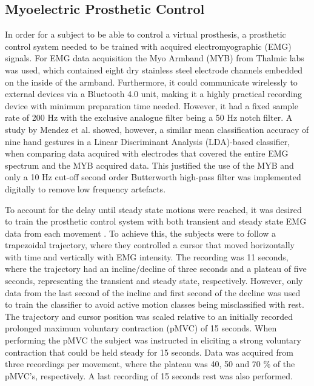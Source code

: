 \subsection{Myoelectric Prosthetic Control}

In order for a subject to be able to control a virtual prosthesis, a prosthetic control system needed to be trained with acquired electromyographic (EMG) signals. For EMG data acquisition the Myo Armband (MYB) from Thalmic labs was used, which contained eight dry stainless steel electrode channels embedded on the inside of the armband. Furthermore, it could communicate wirelessly to external devices via a Bluetooth 4.0 unit, making it a highly practical recording device with minimum preparation time needed. However, it had a fixed sample rate of 200 Hz with the exclusive analogue filter being a 50 Hz notch filter. A study by Mendez et al. \cite{Mendez2017} showed, however, a similar mean classification accuracy of nine hand gestures in a Linear Discriminant Analysis (LDA)-based classifier, when comparing data acquired with electrodes that covered the entire EMG spectrum and the MYB acquired data. This justified the use of the MYB and only a 10 Hz cut-off second order Butterworth high-pass filter was implemented digitally to remove low frequency artefacts.

To account for the delay until steady state motions were reached, it was desired to train the prosthetic control system with both transient and steady state EMG data from each movement \cite{Boschmann2013}. To achieve this, the subjects were to follow a trapezoidal trajectory, where they controlled a cursor that moved horizontally with time and vertically with EMG intensity. The recording was 11 seconds, where the trajectory had an incline/decline of three seconds and a plateau of five seconds, representing the transient and steady state, respectively. However, only data from the last second of the incline and first second of the decline was used to train the classifier to avoid active motion classes being misclassified with rest. The trajectory and cursor position was scaled relative to an initially recorded prolonged maximum voluntary contraction (pMVC) of 15 seconds. When performing the pMVC the subject was instructed in eliciting a strong voluntary contraction that could be held steady for 15 seconds. Data was acquired from three recordings per movement, where the plateau was 40, 50 and 70 $\%$ of the pMVC's, respectively. A last recording of 15 seconds rest was also performed.


